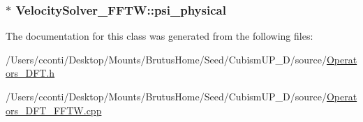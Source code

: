 \subsubsection[{psi\+\_\+physical}]{$\ast$ Velocity\+Solver\+\_\+\+F\+F\+T\+W\+::psi\+\_\+physical\hspace{0.3cm}{\ttfamily [protected]}}\label{class_velocity_solver___f_f_t_w_ac0176cfda775251bb353dc0fdd3a21a4}


The documentation for this class was generated from the following files\+:\begin{DoxyCompactItemize}
\item 
/\+Users/cconti/\+Desktop/\+Mounts/\+Brutus\+Home/\+Seed/\+Cubism\+U\+P\+\_\+D/source/\hyperlink{_operators___d_f_t_8h}{Operators\+\_\+\+D\+F\+T.\+h}\item 
/\+Users/cconti/\+Desktop/\+Mounts/\+Brutus\+Home/\+Seed/\+Cubism\+U\+P\+\_\+D/source/\hyperlink{_operators___d_f_t___f_f_t_w_8cpp}{Operators\+\_\+\+D\+F\+T\+\_\+\+F\+F\+T\+W.\+cpp}\end{DoxyCompactItemize}
